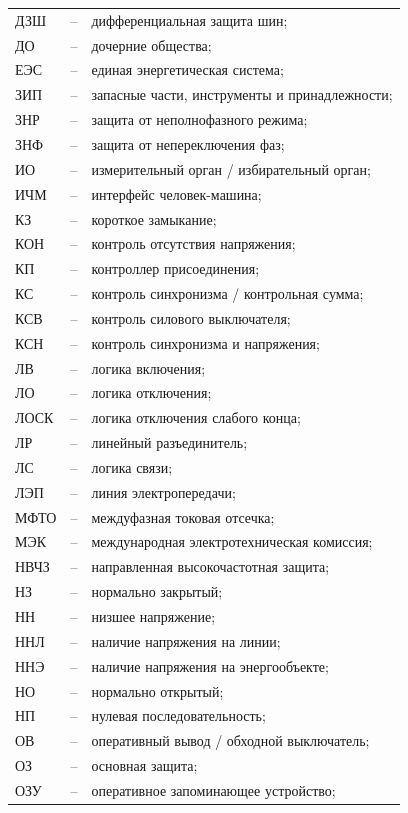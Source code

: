 \begin{longtable}{>{\raggedright\arraybackslash}m{2cm}>{\raggedright\arraybackslash}m{0.5cm}>{\raggedright\arraybackslash}m{20cm}}
ДЗШ & -- & дифференциальная защита шин; \\
ДО & -- & дочерние общества; \\
ЕЭС & -- & единая энергетическая система; \\
ЗИП & -- & запасные части, инструменты и принадлежности; \\
ЗНР & -- & защита от неполнофазного режима; \\
ЗНФ & -- & защита от непереключения фаз; \\
ИО & -- & измерительный орган / избирательный орган; \\
ИЧМ & -- & интерфейс человек-машина; \\
КЗ & -- & короткое замыкание; \\
КОН & -- & контроль отсутствия напряжения; \\
КП & -- & контроллер присоединения; \\
КС & -- & контроль синхронизма / контрольная сумма; \\
КСВ & -- & контроль силового выключателя; \\
КСН & -- & контроль синхронизма и напряжения; \\
ЛВ & -- & логика включения; \\
ЛО & -- & логика отключения; \\
ЛОСК & -- & логика отключения слабого конца; \\
ЛР & -- & линейный разъединитель; \\
ЛС & -- & логика связи; \\
ЛЭП & -- & линия электропередачи; \\
МФТО & -- & междуфазная токовая отсечка; \\
МЭК & -- & международная электротехническая комиссия; \\
НВЧЗ & -- & направленная высокочастотная защита; \\
НЗ & -- & нормально закрытый; \\
НН & -- & низшее напряжение; \\
ННЛ & -- & наличие напряжения на линии; \\
ННЭ & -- & наличие напряжения на энергообъекте; \\
НО & -- & нормально открытый; \\
НП & -- & нулевая последовательность; \\
ОВ & -- & оперативный вывод / обходной выключатель; \\
ОЗ & -- & основная защита; \\
ОЗУ & -- & оперативное запоминающее устройство; \\

\end{longtable}
